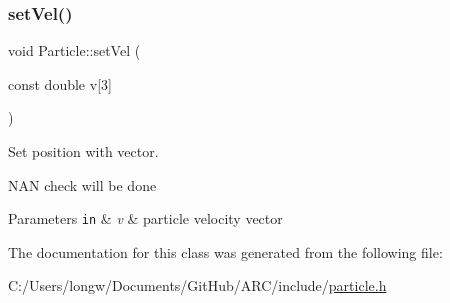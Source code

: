 \subsubsection{\texorpdfstring{set\+Vel()}{setVel()}\hspace{0.1cm}{\footnotesize\ttfamily [2/2]}}
{\footnotesize\ttfamily void Particle\+::set\+Vel (\begin{DoxyParamCaption}\item[{const double}]{v\mbox{[}3\mbox{]} }\end{DoxyParamCaption})\hspace{0.3cm}{\ttfamily [inline]}}



Set position with vector. 

N\+AN check will be done 
\begin{DoxyParams}[1]{Parameters}
\mbox{\tt in}  & {\em v} & particle velocity vector \\
\hline
\end{DoxyParams}


The documentation for this class was generated from the following file\+:\begin{DoxyCompactItemize}
\item 
C\+:/\+Users/longw/\+Documents/\+Git\+Hub/\+A\+R\+C/include/\hyperlink{particle_8h}{particle.\+h}\end{DoxyCompactItemize}
